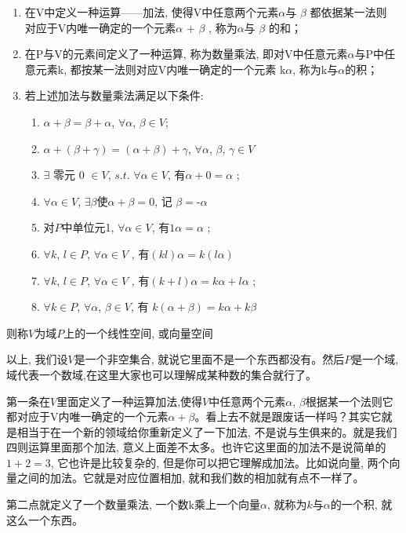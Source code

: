 \begin{enumerate}
  \item 在V中定义一种运算——加法, 使得V中任意两个元素$\alpha$与 $\beta$ 都依据某一法则 对应于V内唯一确定的一个元素$\alpha$ + $\beta$ , 称为$\alpha$与 $\beta$ 的和；
  \item 在P与V的元素间定义了一种运算, 称为数量乘法, 即对V中任意元素$\alpha$与P中任意元素k, 都按某一法则对应V内唯一确定的一个元素 k$\alpha$, 称为k与$\alpha$的积；
  \item 若上述加法与数量乘法满足以下条件: 
  \begin{enumerate}
   \item $\alpha+\beta=\beta+\alpha$, $\forall\alpha$, $\beta\in V$; 
   \item $\alpha+(\beta+\gamma) = (\alpha+\beta)+\gamma$, $\forall\alpha$, $\beta$, $\gamma\in V$ 
   \item $\exists$ 零元 0 $\in V$, $s.t.$ $\forall\alpha\in V$, 有$\alpha+0 = \alpha$ ;
   \item $\forall\alpha\in V$, $\exists\beta$使$\alpha+\beta = 0$, 记 $\beta = \mbox{-}\alpha$
   \item 对$P$中单位元1, $\forall\alpha\in V$, 有$1\alpha = \alpha$ ;
   \item $\forall k$,  $l\in P$, $\forall\alpha\in V$ , 有$(kl)\alpha =  k(l\alpha)$ 
   \item $\forall k$,  $l\in P$, $\forall\alpha\in V$ , 有$(k+ l)\alpha =  k\alpha+ l\alpha$ ; 
   \item $\forall k\in P$, $\forall\alpha$, $\beta\in V$, 有 $k(\alpha+\beta) =  k\alpha+ k\beta$ 
  \end{enumerate}
\end{enumerate}

则称$V$为域$P$上的一个线性空间, 或向量空间

以上, 我们设$V$是一个非空集合, 就说它里面不是一个东西都没有。然后$P$是一个域, 域代表一个数域,在这里大家也可以理解成某种数的集合就行了。

第一条在$V$里面定义了一种运算加法,使得$V$中任意两个元素$\alpha$, $\beta$根据某一个法则它都对应于V内唯一确定的一个元素$\alpha+\beta$。看上去不就是跟废话一样吗？其实它就是相当于在一个新的领域给你重新定义了一下加法, 不是说与生俱来的。就是我们四则运算里面那个加法, 意义上面差不太多。也许它这里面的加法不是说简单的$1+2=3$, 它也许是比较复杂的, 但是你可以把它理解成加法。比如说向量, 两个向量之间的加法。它就是对应位置相加, 就和我们数的相加就有点不一样了。

第二点就定义了一个数量乘法, 一个数k乘上一个向量$\alpha$, 就称为$k$与$\alpha$的一个积, 就这么一个东西。

